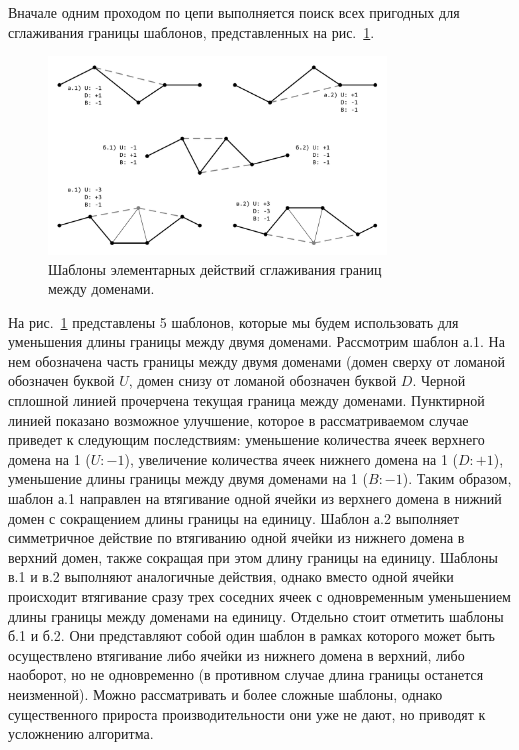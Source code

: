 Вначале одним проходом по цепи выполняется поиск всех пригодных для сглаживания границы шаблонов, представленных на рис.~\ref{fig:text_2_smooth_smooth_border}.

\begin{figure}[ht]
\centering
\includegraphics[width=0.8\textwidth]{fig/par_smooth-border.pdf}
\singlespacing
{}\caption{Шаблоны элементарных действий сглаживания границ \\ между доменами.}
\label{fig:text_2_smooth_smooth_border}
\end{figure}

На рис.~\ref{fig:text_2_smooth_smooth_border} представлены 5 шаблонов, которые мы будем использовать для уменьшения длины границы между двумя доменами.
Рассмотрим шаблон а.1.
На нем обозначена часть границы между двумя доменами (домен сверху от ломаной обозначен буквой $U$, домен снизу от ломаной обозначен буквой $D$.
Черной сплошной линией прочерчена текущая граница между доменами.
Пунктирной линией показано возможное улучшение, которое в рассматриваемом случае приведет к следующим последствиям: уменьшение количества ячеек верхнего домена на 1 ($U: -1$), увеличение количества ячеек нижнего домена на 1 ($D: + 1$), уменьшение длины границы между двумя доменами на 1 ($B: -1$).
Таким образом, шаблон а.1 направлен на втягивание одной ячейки из верхнего домена в нижний домен с сокращением длины границы на единицу.
Шаблон а.2 выполняет симметричное действие по втягиванию одной ячейки из нижнего домена в верхний домен, также сокращая при этом длину границы на единицу.
Шаблоны в.1 и в.2 выполняют аналогичные действия, однако вместо одной ячейки происходит втягивание сразу трех соседних ячеек с одновременным уменьшением длины границы между доменами на единицу. Отдельно стоит отметить шаблоны б.1 и б.2.
Они представляют собой один шаблон в рамках которого может быть осуществлено втягивание либо ячейки из нижнего домена в верхний, либо наоборот, но не одновременно (в противном случае длина границы останется неизменной).
Можно рассматривать и более сложные шаблоны, однако существенного прироста производительности они уже не дают, но приводят к усложнению алгоритма.


